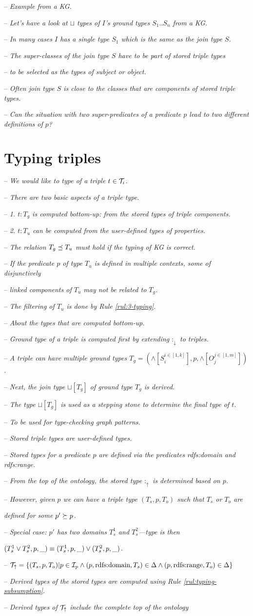 \documentclass[runningheads]{llncs}
\newcommand{\darr}{\downarrow}
\newcommand{\uarr}{\uparrow}
\newcommand{\I}{{\cal I}}
\newcommand{\T}{{\cal T}}
\newcommand{\notes}[1]{\noindent\begin{small}-- \emph{#1}\hfill\break\end{small}}
\newcommand{\nnotes}[1]{\indent\begin{small}-- \emph{#1}\hfill\break\end{small}}
\newcommand{\nnnotes}[1]{\indent\indent\begin{small}-- \emph{#1}\hfill\break\end{small}}
\newcommand{\anotes}[1]{\indent\begin{small}\phantom{-- }\emph{#1}\hfill\break\end{small}}
\begin{document}
\notes{Example from a KG.}
\notes{Let's have a look at $\sqcup$ types of $I$'s ground types $S_1..S_n$ from a KG. }
\nnotes{In many cases $I$ has a single type $S_1$ which is the same as the join type $S$.}
\nnotes{The super-classes of the join type $S$ have to be part of stored triple types}
\nnotes{to be selected as the types of subject or object.}
\nnotes{Often join type $S$ is close to the classes that are components of stored triple types.}
\notes{Can the situation with two super-predicates of a predicate $p$ lead to two different definitions of $p$?}










\section{Typing triples\label{sec:triples}}


\notes{We would like to type of a triple $t\in\T_i$.}
\notes{There are two basic aspects of a triple type.}
\nnotes{1. $t:T_g$ is computed bottom-up: from the stored types of triple components.}
\nnotes{2. $t:T_u$ can be computed from the user-defined types of properties.}
\nnotes{The relation $T_g\preceq\/T_u$ must hold if the typing of KG is correct.}
\nnotes{If the predicate $p$ of type $T_u$ is defined in multiple contexts, some of disjunctively}
\nnotes{linked components of $T_u$ may not be related to $T_g$.}
\nnotes{The filtering of $T_u$ is done by Rule \ref{rul:3-typing}.}

\notes{About the types that are computed bottom-up.}
\nnotes{Ground type of a triple is computed first by extending $:_\darr$ to triples.}
\nnotes{A triple can have multiple ground types $T_g=(\land[S_i^{i\in[1,k]}],p,\land[O_j^{j\in[1,m]}])$.}
\nnotes{Next, the join type $\sqcup[T_g]$ of ground type $T_g$ is derived.}
\nnotes{The type $\sqcup[T_g]$ is used as a stepping stone to determine the final type of $t$.}
\nnnotes{To be used for type-checking graph patterns.}

\notes{Stored triple types are user-defined types.}
\nnotes{Stored types for a predicate $p$ are defined via the predicates rdfs:domain and rdfs:range.}
\nnotes{From the top of the ontology, the stored type $:_\uarr$ is determined based on $p$.}
\nnotes{However, given $p$ we can have a triple type $(T_s,p,T_o)$ such that $T_s$ or $T_o$ are}
\anotes{defined for some $p'\succeq\/p$.}
\nnotes{Special case: $p'$ has two domains $T_s^1$ and $T_s^2$---type is then}
\anotes{$(T_s^1\lor\/T_s^2,p,\_)\equiv\/(T_s^1,p,\_)\lor(T_s^2,p,\_)$.}
\nnotes{$\T_\uarr=\{(T_s,p,T_o)| p\in\I_p\land(p,\text{rdfs:domain},T_s)\in\Delta\land(p,\text{rdfs:range},T_o)\in\Delta\}$} 
\nnotes{Derived types of the stored types are computed using Rule \ref{rul:typing-subsumption}.}
\nnotes{Derived types of $\T_\uarr$ include the complete top of the ontology }
\end{document}

